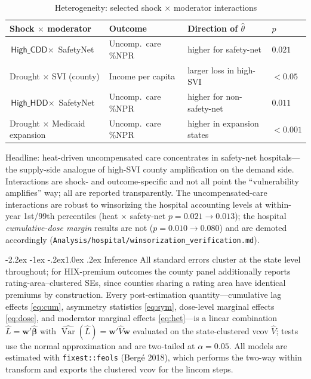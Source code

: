 \documentclass[11pt]{article}
\makeatletter
\renewcommand\section{\@startsection{section}{1}{\z@}%
  {-2.2ex \@plus -1ex \@minus -.2ex}{1.0ex \@plus .2ex}%
  {\normalfont\large\bfseries}}
\makeatother
\begin{document}
\begin{table}[h]
\centering
\caption{Heterogeneity: selected shock $\times$ moderator interactions}
\label{tab:het}
\small
\begin{tabular}{llll}
\toprule
Shock $\times$ moderator & Outcome & Direction of $\hat\theta$ & $p$ \\
\midrule
$\textsf{High\_CDD}\times$ SafetyNet & Uncomp.\ care \%NPR & higher for safety-net & $0.021$ \\
Drought $\times$ SVI (county) & Income per capita & larger loss in high-SVI & $<0.05$ \\
$\textsf{High\_HDD}\times$ SafetyNet & Uncomp.\ care \%NPR & higher for non-safety-net & $0.011$ \\
Drought $\times$ Medicaid expansion & Uncomp.\ care \%NPR & higher in expansion states & $<0.001$ \\
\bottomrule
\end{tabular}

\vspace{2pt}
\footnotesize\raggedright
Headline: heat-driven uncompensated care concentrates in safety-net hospitals---the
supply-side analogue of high-SVI county amplification on the demand side. Interactions
are shock- and outcome-specific and not all point the ``vulnerability amplifies'' way;
all are reported transparently. The uncompensated-care interactions are robust to
winsorizing the hospital accounting levels at within-year 1st/99th percentiles (heat
$\times$ safety-net $p=0.021\to0.013$); the hospital \emph{cumulative-dose margin}
results are not ($p=0.010\to0.080$) and are demoted accordingly
(\texttt{Analysis/hospital/winsorization\_verification.md}).
\end{table}

\section{Inference}
All standard errors cluster at the state level throughout; for HIX-premium outcomes
the county panel additionally reports rating-area--clustered SEs, since counties
sharing a rating area have identical premiums by construction. Every post-estimation
quantity---cumulative lag effects \eqref{eq:cum}, asymmetry statistics \eqref{eq:sym},
dose-level marginal effects \eqref{eq:dose}, and moderator marginal effects
\eqref{eq:het}---is a linear combination $\hat L=\mathbf w'\hat{\boldsymbol\beta}$ with
$\widehat{\operatorname{Var}}(\hat L)=\mathbf w'\hat V\mathbf w$ evaluated on the
state-clustered vcov $\hat V$; tests use the normal approximation and are two-tailed at
$\alpha=0.05$. All models are estimated with \texttt{fixest::feols} (Bergé 2018), which
performs the two-way within transform and exports the clustered vcov for the
lincom steps.
\end{document}
